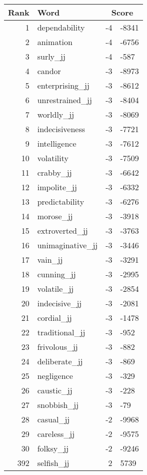 \begin{longtable}[!htbp]{| rlr@{.}l |}
    \hline
    \textbf{Rank} & \textbf{Word} & \multicolumn{2}{c|}{\textbf{Score}} \\
    \hline
    \endhead
    1 & dependability & -4 & -8341 \\
    2 & animation & -4 & -6756 \\
    3 & surly\_jj & -4 & -587 \\
    4 & candor & -3 & -8973 \\
    5 & enterprising\_jj & -3 & -8612 \\
    6 & unrestrained\_jj & -3 & -8404 \\
    7 & worldly\_jj & -3 & -8069 \\
    8 & indecisiveness & -3 & -7721 \\
    9 & intelligence & -3 & -7612 \\
    10 & volatility & -3 & -7509 \\
    11 & crabby\_jj & -3 & -6642 \\
    12 & impolite\_jj & -3 & -6332 \\
    13 & predictability & -3 & -6276 \\
    14 & morose\_jj & -3 & -3918 \\
    15 & extroverted\_jj & -3 & -3763 \\
    16 & unimaginative\_jj & -3 & -3446 \\
    17 & vain\_jj & -3 & -3291 \\
    18 & cunning\_jj & -3 & -2995 \\
    19 & volatile\_jj & -3 & -2854 \\
    20 & indecisive\_jj & -3 & -2081 \\
    21 & cordial\_jj & -3 & -1478 \\
    22 & traditional\_jj & -3 & -952 \\
    23 & frivolous\_jj & -3 & -882 \\
    24 & deliberate\_jj & -3 & -869 \\
    25 & negligence & -3 & -329 \\
    26 & caustic\_jj & -3 & -228 \\
    27 & snobbish\_jj & -3 & -79 \\
    28 & casual\_jj & -2 & -9968 \\
    29 & careless\_jj & -2 & -9575 \\
    30 & folksy\_jj & -2 & -9246 \\
    392 & selfish\_jj & 2 & 5739 \\

\end{longtable}

